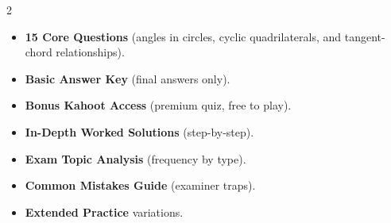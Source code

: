 \documentclass[11pt,a4paper]{article}
\newcommand{\FullReleaseDate}{April 30, 2026}
\begin{document}
\vspace{8pt}

\begin{multicols}{2}
  \begin{tcolorbox}[card, title=\sffamily\bfseries\textcolor{white}{\faHandPointDown\ TODAY (Simplified Version)}, colbacktitle=mainblue, boxed title style={sharp corners, boxrule=0pt}]
    \begin{itemize}[leftmargin=1.2em, itemsep=2pt]
      \item \small \textbf{15 Core Questions} (angles in circles, cyclic quadrilaterals, and tangent-chord relationships).
      \item \small \textbf{Basic Answer Key} (final answers only).
      \item \small \textbf{Bonus Kahoot Access} (premium quiz, free to play).
    \end{itemize}
  \end{tcolorbox}

  \columnbreak

  \begin{tcolorbox}[card, title=\sffamily\bfseries\textcolor{white}{\faRocket\ ON \FullReleaseDate\ (Full Upgrade)}, colbacktitle=mainblue, boxed title style={sharp corners, boxrule=0pt}]
    \begin{itemize}[leftmargin=1.2em, itemsep=2pt]
      \item \small \textbf{In-Depth Worked Solutions} (step-by-step).
      \item \small \textbf{Exam Topic Analysis} (frequency by type).
      \item \small \textbf{Common Mistakes Guide} (examiner traps).
      \item \small \textbf{Extended Practice} variations.
    \end{itemize}
  \end{tcolorbox}
\end{multicols}
\end{document}
